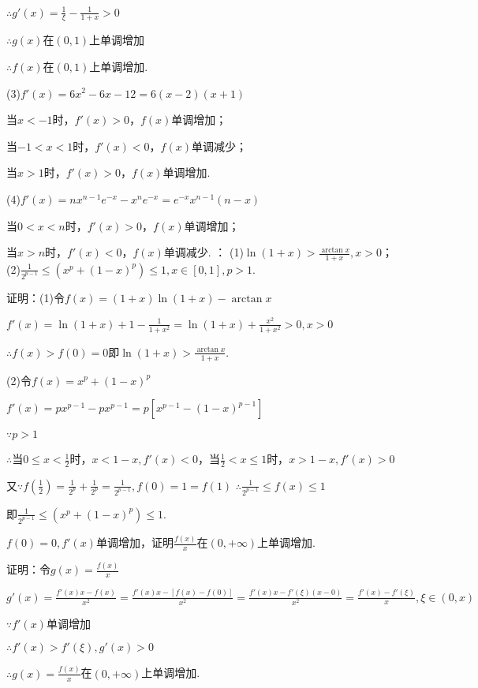 \documentclass[12pt,UTF8]{ctexart}
\begin{document}
\begin{enumerate}
$\therefore g'(x)=\frac1\xi-\frac1{1+x}>0$

$\therefore g(x)$在$(0,1)$上单调增加

$\therefore f(x)$在$(0,1)$上单调增加.

(3)$f'(x)=6x^2-6x-12=6(x-2)(x+1)$

当$x<-1$时，$f'(x)>0$，$f(x)$单调增加；

当$-1<x<1$时，$f'(x)<0$，$f(x)$单调减少；

当$x>1$时，$f'(x)>0$，$f(x)$单调增加.

(4)$f'(x)=nx^{n-1}e^{-x}-x^ne^{-x}=e^{-x}x^{n-1}(n-x)$

当$0<x<n$时，$f'(x)>0$，$f(x)$单调增加；

当$x>n$时，$f'(x)<0$，$f(x)$单调减少.
：
\newline
(1)$\ln(1+x)>\frac{\arctan x}{1+x},x>0$；
\newline
(2)$\frac1{2^{p-1}}\leq(x^p+(1-x)^p)\leq1,x\in[0,1],p>1$.

证明：(1)令$f(x)=(1+x)\ln(1+x)-\arctan x$

$f'(x)=\ln(1+x)+1-\frac1{1+x^2}=\ln(1+x)+\frac{x^2}{1+x^2}>0,x>0$

$\therefore f(x)>f(0)=0$即$\ln(1+x)>\frac{\arctan x}{1+x}$.

(2)令$f(x)=x^p+(1-x)^p$

$f'(x)=px^{p-1}-px^{p-1}=p[x^{p-1}-(1-x)^{p-1}]$

$\because p>1$

$\therefore$当$0\leq x<\frac12$时，$x<1-x,f'(x)<0$，当$\frac12<x\leq1$时，$x>1-x,f'(x)>0$

又$\because f(\frac12)=\frac1{2^p}+\frac1{2^p}=\frac1{2^{p-1}},f(0)=1=f(1)$
$\therefore\frac1{2^{p-1}}\leq f(x)\leq1$

即$\frac1{2^{p-1}}\leq(x^p+(1-x)^p)\leq1$.

$f(0)=0,f'(x)$单调增加，证明$\frac{f(x)}x$在$(0,+\infty)$上单调增加.

证明：令$g(x)=\frac{f(x)}x$

$g'(x)=\frac{f'(x)x-f(x)}{x^2}=\frac{f'(x)x-[f(x)-f(0)]}{x^2}=\frac{f'(x)x-f'(\xi)(x-0)}{x^2}=\frac{f'(x)-f'(\xi)}x,\xi\in(0,x)$

$\because f'(x)$单调增加

$\therefore f'(x)>f'(\xi),g'(x)>0$

$\therefore g(x)=\frac{f(x)}x$在$(0,+\infty)$上单调增加.

\end{enumerate}
\end{document}

